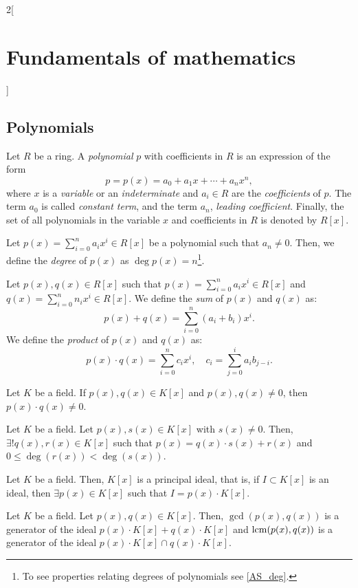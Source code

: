 \documentclass[../../../main.tex]{subfiles}
\begin{document}
\begin{multicols}{2}[\section{Fundamentals of mathematics}]
  \subsection{Polynomials}
  \begin{definition}
    Let $R$ be a ring. A \emph{polynomial} $p$ with coefficients in $R$ is an expression of the form $$p=p(x)=a_0+a_1x+\cdots+a_nx^n,$$ where $x$ is a \emph{variable} or an \emph{indeterminate} and $a_i\in R$ are the \emph{coefficients} of $p$. The term $a_0$ is called \emph{constant term}, and the term $a_n$, \emph{leading coefficient}. Finally, the set of all polynomials in the variable $x$ and coefficients in $R$ is denoted by $R[x]$.
  \end{definition}
  \begin{definition}
    Let $p(x)=\sum_{i=0}^na_ix^i\in R[x]$ be a polynomial such that $a_n\ne 0$. Then, we define the \emph{degree} of $p(x)$ as $\deg p(x)=n$\footnote{To see properties relating degrees of polynomials see \cref{AS_deg}.}.
  \end{definition}
  \begin{definition}
    Let $p(x),q(x)\in R[x]$ such that $p(x)=\sum_{i=0}^na_ix^i\in R[x]$ and $q(x)=\sum_{i=0}^nn_ix^i\in R[x]$. We define the \emph{sum} of $p(x)$ and $q(x)$ as: $$p(x)+q(x)=\sum_{i=0}^n(a_i+b_i)x^i.$$
    We define the \emph{product} of $p(x)$ and $q(x)$ as: $$p(x)\cdot q(x)=\sum_{i=0}^nc_ix^i,\quad c_i=\sum_{j=0}^ia_ib_{j-i}.$$
  \end{definition}
  \begin{prop}
    Let $K$ be a field. If $p(x),q(x)\in K[x]$ and $p(x),q(x)\ne 0$, then $p(x)\cdot q(x)\ne 0$.
  \end{prop}
  \begin{theorem}
    Let $K$ be a field. Let $p(x),s(x)\in K[x]$ with $s(x)\ne 0$. Then, $\exists! q(x),r(x)\in K[x]$ such that $p(x)=q(x)\cdot s(x)+r(x)$ and $0\leq\deg(r(x))<\deg(s(x))$.
  \end{theorem}
  \begin{theorem}
    Let $K$ be a field. Then, $K[x]$ is a principal ideal, that is, if $I\subset K[x]$ is an ideal, then $\exists p(x)\in K[x]$ such that $I=p(x)\cdot K[x]$.
  \end{theorem}
  \begin{definition}
    Let $K$ be a field. Let $p(x),q(x)\in K[x]$. Then, $\gcd(p(x),q(x))$ is a generator of the ideal $p(x)\cdot K[x]+q(x)\cdot K[x]$ and $\operatorname{lcm}(p(x),q(x))$ is a generator of the ideal $p(x)\cdot K[x]\cap q(x)\cdot K[x]$.

\end{definition}
\end{multicols}
\end{document}
